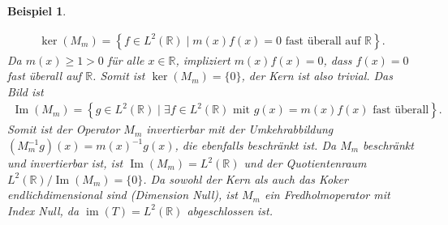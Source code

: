 \documentclass[11pt, hidelinks]{article}
\newcommand{\im}{\operatorname{im}}
\numberwithin{conj}{section}
\newtheorem{example}[conj]{Beispiel}
\begin{document}
\begin{example}
\begin{enumerate}
        \begin{align}
        \ker(M_m) = \left\{ f \in L^2(\mathbb{R}) \mid m(x) f(x) = 0 \text{ fast überall auf } \mathbb{R} \right\}.
        \end{align}
        Da \( m(x) \geq 1 > 0 \) für alle \( x \in \mathbb{R} \), impliziert \( m(x) f(x) = 0 \), dass \( f(x) = 0 \) fast überall auf \( \mathbb{R} \). Somit ist $\ker(M_m) = \{0\}$, der Kern ist also trivial. Das Bild ist
        \begin{align}
            \operatorname{Im}(M_m) = \left\{ g \in L^2(\mathbb{R}) \mid \exists f \in L^2(\mathbb{R}) \text{ mit } g(x) = m(x) f(x) \text{ fast überall} \right\}.
        \end{align}
        Somit ist der Operator \( M_m \) invertierbar mit der Umkehrabbildung $(M_m^{-1} g)(x) = m(x)^{-1} g(x)$, die ebenfalls beschränkt ist. Da \( M_m \) beschränkt und invertierbar ist, ist \( \operatorname{Im}(M_m) = L^2(\mathbb{R}) \) und der Quotientenraum \( L^2(\mathbb{R}) / \operatorname{Im}(M_m) =  \{0\}\). Da sowohl der Kern als auch das Koker endlichdimensional sind (Dimension Null), ist \( M_m \) ein Fredholmoperator mit Index Null, da $\im(T) = L^2(\mathbb{R})$ abgeschlossen ist.
    \end{enumerate}
\end{example}
\end{document}
